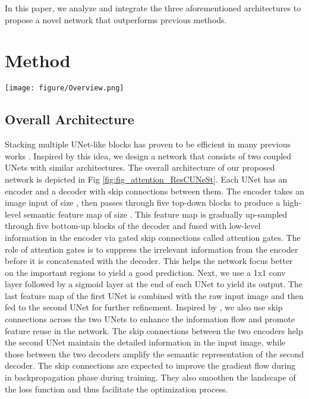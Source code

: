 \documentclass[review, sort&compress]{elsarticle}
\begin{document}
In this paper, we analyze and integrate the three aforementioned architectures  \cite{tang2019cu,jha2020doubleu,oktay2018attention} to propose a novel network that outperforms previous methods.



\section{Method}
\label{sec:propose}
\begin{figure*}[ht!]
\texttt{[image: figure/Overview.png]}
\caption{An overview of the proposed AG-CUResNeSt. Attention gates within each UNet are used to suppress irrelevant information in the encoder's feature maps. Skip connections across the two UNets are also utilized to boost the information flow and promote feature reuse.}
\label{fig:fig_attention_ResCUNeSt}
\end{figure*}

\subsection{Overall Architecture}
Stacking multiple UNet-like blocks has proven to be efficient in many previous works \cite{newell2016stacked, jha2020doubleu, tang2019cu}. Inspired by this idea, we design a network that consists of two coupled UNets with similar architectures. The overall architecture of our proposed network is depicted in Fig \ref{fig:fig_attention_ResCUNeSt}. Each UNet has an encoder and a decoder with skip connections between them. The encoder takes an image input of size , then passes through five top-down blocks to produce a high-level semantic feature map of size . This feature map is gradually up-sampled through five bottom-up blocks of the decoder and fused with low-level information in the encoder via gated skip connections called attention gates. The role of attention gates is to suppress the irrelevant information from the encoder before it is concatenated with the decoder. This helps the network focus better on the important regions to yield a good prediction. Next, we use a 1x1 conv layer followed by a sigmoid layer at the end of each UNet to yield its output. The last feature map of the first UNet is combined with the raw input image and then fed to the second UNet for further refinement. Inspired by \cite{tang2019cu}, we also use skip connections across the two UNets to enhance the information flow and promote feature reuse in the network. The skip connections between the two encoders help the second UNet maintain the detailed information in the input image, while those between the two decoders amplify the semantic representation of the second decoder. The skip connections are expected to improve the gradient flow during in backpropagation phase during training. They also smoothen the landscape of the loss function \cite{DBLP:conf/nips/Li0TSG18} and thus facilitate the optimization process.
\end{document}
